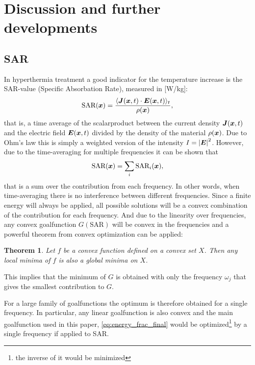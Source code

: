 \documentclass[11pt,a4paper, 
swedish,english %
]{article}
\begin{document}
\section{Discussion and further developments}
\label{ch:discussion}
\subsection{SAR}
\newtheorem{theorem}{Theorem}
In hyperthermia treatment a good indicator for the temperature increase is the SAR-value (Specific Absorbation Rate), measured in [W/kg]:
\begin{equation*}
\text{SAR}(\vb*x)=\frac{\langle \vb*J(\vb*x,t)\cdot \vb*E(\vb*x,t) \rangle_t}{\rho(\vb*x)},
\end{equation*}
that is, a time average of the scalarproduct between the current density $\vb*J(\vb*x,t)$ and the electric field $\vb*E(\vb*x,t)$ divided by the density of the material $\rho(\vb*x)$. Due to Ohm's law this is simply a weighted version of the intensity $I=\abs{\vb*E}^2$. However, due to the time-averaging for multiple frequencies it can be shown that
\begin{equation}
\text{SAR}(\vb*x)=\sum_i\text{SAR}_i(\vb*x),         %
\end{equation}
that is a sum over the contribution from each frequency. In other words, when time-averaging there is no interference between different frequencies.
Since a finite energy will always be applied, all possible solutions will be a convex combination of the contribution for each frequency. And due to the linearity over frequencies, any convex goalfunction $G(\text{SAR})$ will be convex in the frequencies and a powerful theorem from convex optimization can be applied:
\begin{theorem}
 Let $f$ be a convex function defined on a convex set $X$. Then any local minima of $f$ is also a global minima on $X$.
\end{theorem}
This implies that the minimum of $G$ is obtained with only the frequency $\omega_j$ that gives the smallest contribution to $G$.

For a large family of goalfunctions the optimum is therefore obtained for a single frequency. In particular, any linear goalfunction is also convex and the main goalfunction used in this paper, \eqref{eq:energy_frac_final} would be optimized\footnote{the inverse of it would be minimized} by a single frequency if applied to SAR. 
\end{document}
